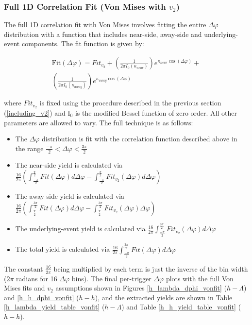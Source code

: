 \documentclass[ALICE,manyauthors]{ALICE_analysis_notes}
\begin{document}
\subsubsection{Full 1D Correlation Fit (Von Mises with $v_{2}$)}
\label{full_correlation_fit_von}
The full 1D correlation fit with  Von Mises involves fitting the entire $\Delta\varphi$ distribution with a function that includes near-side, away-side and underlying-event components. The fit function is given by:

\begin{gather*}
	\text{Fit}(\Delta\varphi) = Fit_{v_{2}} +
	(\frac{1}{2\pi I_{0}(\kappa_{near})})e^{\kappa_{near} \cos(\Delta\varphi)} +  \\
	(\frac{1}{2\pi I_{0}(\kappa_{away})})e^{\kappa_{away} \cos(\Delta\varphi)} 
\end{gather*}

where $Fit_{v_{2}}$ is fixed using the procedure described in the previous section (\ref{including_v2}) and I$_0$ is the modified Bessel function of zero order. All other parameters are allowed to vary. The full technique is as follows:

\begin{itemize}
\item The $\Delta\varphi$ distribution is fit with the correlation function described above in the range $\frac{-\pi}{2} < \Delta\varphi < \frac{3\pi}{2}$
\item The near-side yield is calculated via $\frac{16}{2\pi}(\int_{\frac{-\pi}{2}}^{\frac{\pi}{2}}Fit(\Delta\varphi)d\Delta\varphi - \int_{\frac{-\pi}{2}}^{\frac{\pi}{2}}Fit_{v_{2}}(\Delta\varphi) d\Delta\varphi)$
\item The away-side yield is calculated via $\frac{16}{2\pi}(\int_{\frac{\pi}{2}}^{\frac{3\pi}{2}}Fit(\Delta\varphi)d\Delta\varphi - \int_{\frac{\pi}{2}}^{\frac{3\pi}{2}}Fit_{v_{2}}(\Delta\varphi)\Delta\varphi)$
\item The underlying-event yield is calculated via $\frac{16}{2\pi}\int_{\frac{-\pi}{2}}^{\frac{3\pi}{2}}Fit_{v_{2}}(\Delta\varphi) d\Delta\varphi$
\item The total yield is calculated via $\frac{16}{2\pi}\int_{\frac{-\pi}{2}}^{\frac{3\pi}{2}}Fit(\Delta\varphi) d\Delta\varphi$
\end{itemize}

The constant $\frac{16}{2\pi}$ being multiplied by each term is just the inverse of the bin width ($2\pi$ radians for 16 $\Delta\varphi$ bins).
The final per-trigger $\Delta\varphi$ plots with the full Von Mises fits and $v_{2}$ assumptions shown in Figures \ref{h_lambda_dphi_vonfit} ($h-\Lambda$) and \ref{h_h_dphi_vonfit} ($h-h$), and the extracted yields are shown in Table \ref{h_lambda_yield_table_vonfit} ($h-\Lambda$) and Table \ref{h_h_yield_table_vonfit} ($h-h$). 
\end{document}

